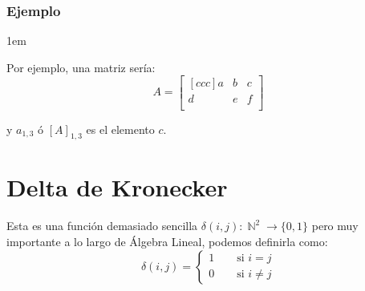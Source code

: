 \documentclass[12pt, fleqn]{report}                             %
\newenvironment{SmallIndentation}[1][0.75em]                    %
        {\begin{adjustwidth}{#1}{}\begin{footnotesize}}             %
        {\end{footnotesize}\end{adjustwidth}}                       %
\DeclareMathOperator \Space     {\quad}                         %
\theoremstyle{break}                                            %
\DeclareMathOperator \Naturals     {\mathbb{N}}                 %
\begin{document}
            \subsubsection*{Ejemplo}
                \begin{SmallIndentation}[1em]
                    
                    Por ejemplo, una matriz sería:
                    \begin{equation*}
                        A =
                        \begin{bmatrix}[ccc]
                            a & b & c   \\
                            d & e & f   \\
                        \end{bmatrix}
                    \end{equation*}

                    y $a_{1,3}$ ó $[A]_{1, 3}$ es el elemento $c$.
                
                \end{SmallIndentation}
                


        \vspace{1em}
        \section{Delta de Kronecker}

            Esta es una función demasiado sencilla $\delta(i,j): \Naturals^2 \to \{0,1\}$
            pero muy importante a lo largo de Álgebra Lineal, podemos definirla como:
            \begin{equation*}
                \delta(i,j) =
                \begin{cases}
                    1 \Space \text{ si } i = j      \\
                    0 \Space \text{ si } i \neq j
                \end{cases}
            \end{equation*}
\end{document}
